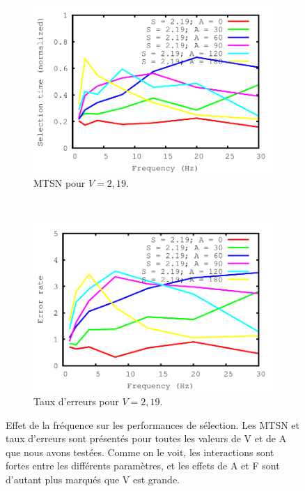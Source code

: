 \begin{figure}[!htb]
\begin{subfigure}[t]{\subImgWlineplot}
			\includegraphics[width=\textwidth]{figures/ch4/frequency_speed_2_19_times}
			\caption{MTSN pour $V = 2,19$.}
			\label{fig:fEffect_t_219}
		\end{subfigure}
		~
		\begin{subfigure}[t]{\subImgWlineplot}
			\centering
			\includegraphics[width=\textwidth]{figures/ch4/frequency_speed_2_19_errors}
			\caption{Taux d'erreurs pour $V = 2,19$.}
			\label{fig:fEffect_e_219}
		\end{subfigure}
		\caption[Effet de la fréquence sur les performances de sélection]{Effet de la fréquence sur les performances de sélection. Les MTSN et taux d'erreurs sont présentés pour toutes les valeurs de V et de A que nous avons testées. Comme on le voit, les interactions sont fortes entre les différents paramètres, et les effets de A et F sont d'autant plus marqués que V est grande.}
		\label{fig:fEffectPerf}
	\end{figure}

